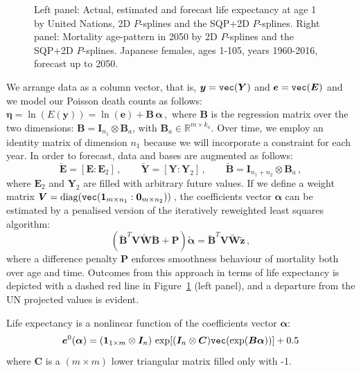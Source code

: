 \documentclass[a4paper,twoside, openright, 12pt, leqno]{article}
\begin{document}
\begin{figure}[!ht]
	\caption{\label{fig:CamardaMort} Left panel: Actual, estimated and forecast life expectancy at age 1 by United Nations, 2D $P$-splines and the SQP+2D $P$-splines. Right panel: Mortality age-pattern in 2050 by 2D $P$-splines and the SQP+2D $P$-splines. Japanese females, ages 1-105, years 1960-2016, forecast up to 2050.}
\end{figure}

We arrange data as a column vector, that is, $\bm{y} = \verb"vec"(\bm{Y})$ and $\bm{e} = \verb"vec"(\bm{E})$ and we model our Poisson death counts as follows: $\bm{\eta} = \ln(E(\bm{y})) = \ln(\bm{e})+ \bm{B}\,\bm{\alpha}\, , $ where $\bm{B}$ is the regression matrix over the two dimensions: $\bm{B} = \bm{I}_{n_{1}} \otimes \bm{B}_{a}$, with $\bm{B}_{a} \in \mathbb{R}^{m \times k_{a}}$. Over time, we employ an identity matrix of dimension $n_{1}$ because we will incorporate a constraint for each year. In order to forecast, data and bases are augmented as follows:
\begin{equation}\label{eq:AugData}
\breve{\bm{E}} = [\bm{E} : \bm{E}_{2}]\, , \qquad 
\breve{\bm{Y}} = [\bm{Y} : \bm{Y}_{2}]\, , \qquad
\breve{\bm{B}} = \bm{I}_{n_{1}+n_{2}} \otimes \bm{B}_{a}
\, ,
\end{equation}
where $\bm{E}_{2}$ and $\bm{Y}_{2}$ are filled with arbitrary future values. If we define a weight matrix $\bm{V} = \mathrm{diag}(\verb"vec"(\bm{1}_{m\times n_{1}}:\bm{0}_{m\times n_{2}}))\,$, the coefficients vector $\bm{\alpha}$
can be estimated by a penalised version of the iteratively reweighted least squares algorithm: 
\begin{equation}\label{eq:penIRWLSfor}
(\breve{\bm{B}}^{T} \bm{V} \tilde{\bm{W}} \breve{\bm{B}} + \bm{P}) \tilde{\bm{\alpha}} =
\breve{\bm{B}}^{T}\bm{V} \tilde{\bm{W}}\tilde{\bm{z}} \, ,
\end{equation} 	
where a difference penalty $\bm{P}$ enforces smoothness behaviour of mortality both over age and time. Outcomes from this approach in terms of life expectancy is depicted with a dashed red line in Figure~\ref{fig:CamardaMort} (left panel), and a departure from the UN projected values is evident. 

Life expectancy is a nonlinear function of the coefficients vector $\bm{\alpha}$:
\begin{equation}\label{eq:e0}
\bm{e}^{0} (\bm{\alpha}) = (\bm{1}_{1 \times m} \otimes \bm{I}_{n}) \, \exp[ (\bm{I}_{n} \otimes \bm{C}) \verb"vec"(\exp(\bm{B}\bm{\alpha}))]  + 0.5 
\end{equation} 
where $\bm{C}$ is a $(m \times m)$ lower triangular matrix filled only with -1. 
\end{document}
